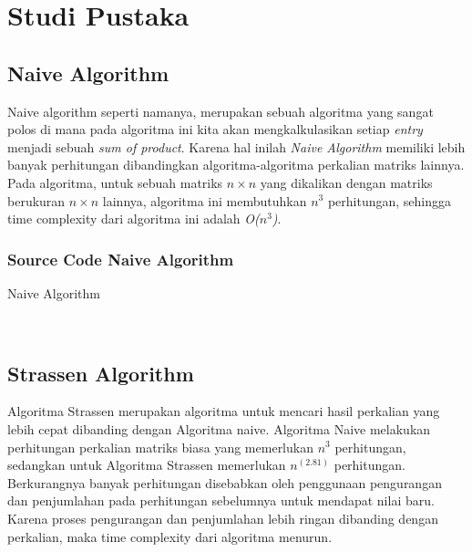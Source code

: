 \documentclass[conference]{IEEEtran}
\begin{document}
\section{Studi Pustaka}
\subsection{Naive Algorithm}
Naive algorithm seperti namanya, merupakan sebuah algoritma yang sangat polos di mana pada algoritma ini kita akan mengkalkulasikan setiap \textit{entry} menjadi sebuah \textit{sum of product}. Karena hal inilah \textit{Naive Algorithm} memiliki lebih banyak perhitungan dibandingkan algoritma-algoritma perkalian matriks lainnya. Pada algoritma, untuk sebuah matriks $n\times n$ yang dikalikan dengan matriks berukuran $n\times n$ lainnya, algoritma ini membutuhkan $n^3$ perhitungan, sehingga time complexity dari algoritma ini adalah \textit{O($n^3$)}.

\subsubsection{Source Code Naive Algorithm}
\begin{algorithm}
    \caption{Naive Algorithm}
    \\
\end{algorithm}

\subsection{Strassen Algorithm}
Algoritma Strassen merupakan algoritma untuk mencari hasil perkalian yang lebih cepat dibanding dengan Algoritma naive.
Algoritma Naive melakukan perhitungan perkalian matriks biasa yang memerlukan $n^3$ perhitungan, sedangkan untuk Algoritma Strassen memerlukan $n^(2.81)$ perhitungan. 
Berkurangnya banyak perhitungan disebabkan oleh penggunaan pengurangan dan penjumlahan pada perhitungan sebelumnya untuk mendapat nilai baru.
Karena proses pengurangan dan penjumlahan lebih ringan dibanding dengan perkalian, maka time complexity dari algoritma menurun.
\end{document}
